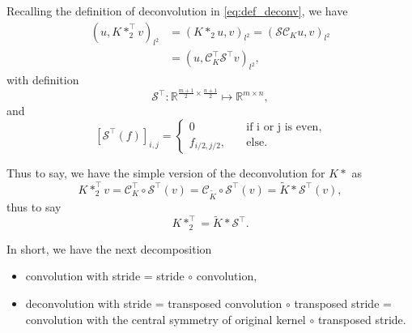 Recalling the definition of deconvolution in \eqref{eq:def_deconv}, we have
\begin{equation}\label{eq:op_deconv}
\begin{aligned}
(u,  K \ast_2^\top v)_{l^2} &= (K \ast_2 u, v)_{l^2} = (\mathcal S \mathcal C_K u, v)_{l^2} \\
&= (u,  \mathcal C^\top_K \mathcal S^\top v)_{l^2},
\end{aligned}
\end{equation}
with definition
\begin{equation}\label{eq:de_stride_dim}
\mathcal S^\top:   \mathbb{R}^{\frac{m+1}{2} \times\frac{n+1}{2}} \mapsto \mathbb{R}^{m\times n},
\end{equation}
and 
\begin{equation}\label{eq:de_stride}
[\mathcal S^\top (f)]_{i,j} = 
\begin{cases}
0 \quad &\text{if i or j is even}, \\
f_{i/2, j/2}, \quad &\text{else}.
\end{cases}
\end{equation}

Thus to say, we have the simple version of the deconvolution for $K \ast $ as
\begin{equation}\label{eq:simple_deconv}
K \ast_2^\top v = \mathcal C_K^\top \circ \mathcal S^\top (v) = \mathcal C_{\tilde K} \circ \mathcal S^\top (v) = \tilde K \ast \mathcal S^\top (v),
\end{equation}
thus to say
\begin{equation}\label{eq:final}
K \ast_2^\top  = \tilde K \ast \mathcal S^\top.
\end{equation}

In short, we have the next decomposition
\begin{itemize}
	\item convolution with stride = stride $ \circ$ convolution,
	\item deconvolution with stride  = transposed convolution $\circ$ transposed stride = convolution with the central symmetry of original kernel $\circ$ transposed stride.
\end{itemize}

